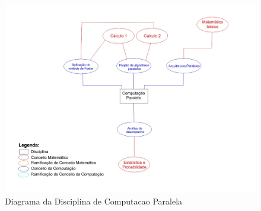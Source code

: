 \documentclass[12pt,a4paper]{article}
\begin{document}
\begin{figure}[!h]
	\centering
	\includegraphics[scale=0.5]{imagens/CP.jpg} 
	\caption{Diagrama da Disciplina de Computacao Paralela}
\end{figure}

\begin{thebibliography}{9}



\end{thebibliography}
\end{document}
